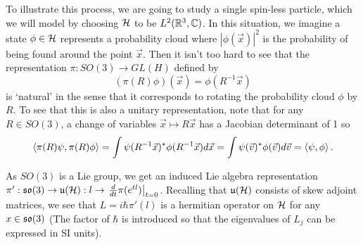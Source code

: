 \documentclass[a4paper]{article}
\begin{document}
To illustrate this process, we are going to study a single spin-less particle, which we will model by choosing $\mathcal{H}$ to be $L^2(\mathbb{R}^3, \mathbb{C})$. In this situation, we imagine a state $\phi \in \mathcal{H}$ represents a probability cloud where $|\phi(\vec{x})|^2$ is the probability of being found around the point $\vec{x}$. Then it isn't too hard to see that the representation $\pi : SO(3) \to GL(H)$ defined by
$$(\pi(R)\phi)(\vec{x}) = \phi(R^{-1}\vec{x})$$
is `natural' in the sense that it corresponds to rotating the probability cloud $\phi$ by $R$. To see that this is also a unitary representation, note that for any $R \in SO(3)$, a change of variables $\vec{x} \mapsto R\vec{x}$ has a Jacobian determinant of 1 so 
$$\left\langle \pi(R)\psi , \pi(R)\phi \right\rangle = \int \psi(R^{-1}\vec{x})^* \phi(R^{-1}\vec{x})d\vec{x} = \int \psi(\vec{v})^* \phi(\vec{v})d\vec{v} = \left\langle \psi , \phi \right\rangle.$$

As $SO(3)$ is a Lie group, we get an induced Lie algebra representation $\pi' : \mathfrak{so}(3) \to \mathfrak{u}(\mathcal{H}) : l \to \left. \frac{d}{dt}\pi(e^{tl})\right|_{t=0}$. Recalling that $\mathfrak{u}(\mathcal{H})$ consists of skew adjoint matrices, we see that $L = i\hbar\pi'(l)$ is a hermitian operator on $\mathcal{H}$ for any $x \in \mathfrak{so}(3)$ (The factor of $\hbar$ is introduced so that the eigenvalues of $L_j$ can be expressed in SI units). 
\end{document}
